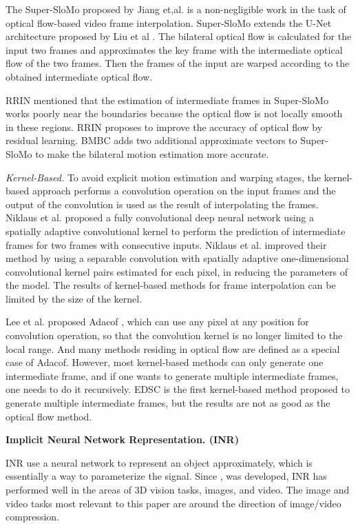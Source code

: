 \documentclass{article}
\begin{document}
The Super-SloMo \cite{jiang2018super} proposed by Jiang et,al. is a non-negligible work in the task of optical flow-based video frame interpolation.
Super-SloMo extends the U-Net architecture proposed by Liu et al \cite{liu2017video}.
The bilateral optical flow is calculated for the input two frames and approximates the key frame with the intermediate optical flow of the two frames.
Then the frames of the input are warped according to the obtained intermediate optical flow.

RRIN \cite{li2020video} mentioned that the estimation of intermediate frames in Super-SloMo works poorly near the boundaries because the optical flow is not locally smooth in these regions.
RRIN proposes to improve the accuracy of optical flow by residual learning.
BMBC \cite{park2020bmbc} adds two additional approximate vectors to Super-SloMo to make the bilateral motion estimation more accurate.


\textit{Kernel-Based.}
To avoid explicit motion estimation and warping stages, the kernel-based approach performs a convolution operation on the input frames and the output of the convolution is used as the result of interpolating the frames.
Niklaus et al. \cite{niklaus2017video1} proposed a fully convolutional deep neural network using a spatially adaptive convolutional kernel to perform the prediction of intermediate frames for two frames with consecutive inputs.
Niklaus et al. \cite{niklaus2017video2} improved their method by using a separable convolution with spatially adaptive one-dimensional convolutional kernel pairs estimated for each pixel, in reducing the parameters of the model.
The results of kernel-based methods for frame interpolation can be limited by the size of the kernel.

Lee et al. proposed Adacof \cite{lee2020adacof}, which can use any pixel at any position for convolution operation,
so that the convolution kernel is no longer limited to the local range.
And many methods residing in optical flow are defined as a special case of Adacof.
However, most kernel-based methods can only generate one intermediate frame, and if one wants to generate multiple intermediate frames, one needs to do it recursively.
EDSC \cite{cheng2021multiple} is the first kernel-based method proposed to generate multiple intermediate frames, but the results are not as good as the optical flow method.


\textbf{Implicit Neural Network Representation. (INR)}

INR use a neural network to represent an object approximately, which is essentially a way to parameterize the signal.
Since \cite{mildenhall2020nerf}, \cite{sitzmann2020implicit} was developed, INR has performed well in the areas of 3D vision tasks, images, and video.
The image and video tasks most relevant to this paper are around the direction of image/video compression.
\end{document}
